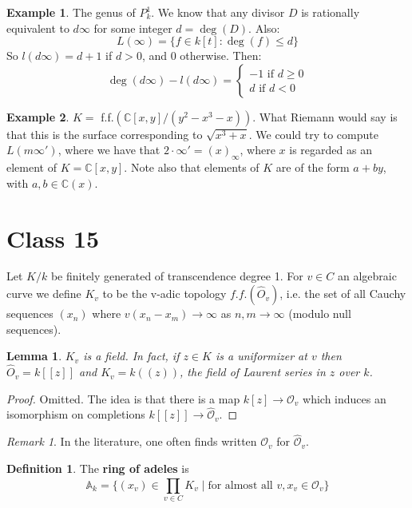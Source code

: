 \documentclass{article}
\newcommand{\C}{\mathbb{C}}
\theoremstyle{plain}
\newtheorem{lem}[thm]{Lemma}
\theoremstyle{definition}
\newtheorem{defn}{Definition}
\newtheorem{exmp}{Example}
\theoremstyle{remark}
\newtheorem*{rem}{Remark}
\begin{document}
\begin{exmp}
The genus of $P_k^1$. We know that any divisor $D$ is rationally equivalent to $d\infty$ for some integer $d = \deg(D)$. Also:
\[       L(\infty) = \{ f\in k[t] : \deg (f) \leq d  \}  \]
So $l(d\infty) = d+1$ if $d>0$, and 0 otherwise. Then:
\[      \deg(d\infty) - l(d\infty) = \left\{  \begin{array} {c} -1 \text{ if } d\geq 0 \\ d \text{ if } d<0  \end{array}  \right.    \]
\end{exmp}
\begin{exmp}
$K = $ f.f.$(\C[x,y]/(y^2 - x^3 -x))$. What Riemann would say is that this is the surface corresponding to $\sqrt{x^3+x}$. We could try to compute $L(m\infty ')$, where we have that $2\cdot \infty' =(x)_{\infty}$, where $x$ is regarded as an element of $K = \C[x,y]$. Note also that elements of $K$ are of the form $a + by$, with $a,b\in \C(x)$.
\end{exmp}

\section*{Class 15}

Let $K/k$ be finitely generated of transcendence degree 1. For $v\in C$ an algebraic curve we define $K_v$ to be the v-adic topology $f.f.(\hat{O}_v)$, i.e. the set of all Cauchy sequences $(x_n)$ where $v(x_n-x_m)\to\infty$ as $n,m\to\infty$ (modulo null sequences).

\begin{lem}
\label{L84}
$K_v$ is a field. In fact, if $z\in K$ is a uniformizer at $v$ then $\hat{O}_v=k[[z]]$ and $K_v=k((z))$, the field of Laurent series in $z$ over $k$.
\end{lem}
\begin{proof}
Omitted. The idea is that there is a map $k[z]\to\mathcal{O}_v$ which induces an isomorphism on completions $k[[z]]\to\hat{\mathcal{O}}_v$.
\end{proof}


\begin{rem}
In the literature, one often finds written $\mathcal{O}_v$ for $\hat{\mathcal{O}}_v$.
\end{rem}

\begin{defn}
The \textbf{ring of adeles} is
\[\mathbb{A}_k=\{(x_v)\in\prod_{v\in C} K_v\mid \text{for almost all }v, x_v\in\hat{\mathcal{O}}_v\} \]
\end{defn}
\end{document}
